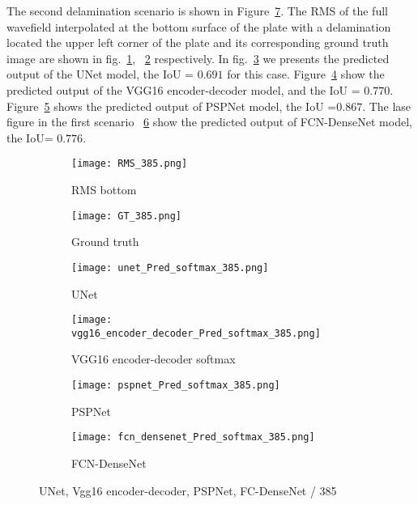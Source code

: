The second delamination scenario is shown in Figure~\ref{fig:385_softmax}. 
The RMS of the full wavefield interpolated at the bottom surface of the plate with a delamination located the upper left corner of the plate and its corresponding ground truth image are shown in fig.~\ref{fig:RMS_flat_shell_Vz_385}, ~\ref{fig:m1_rand_single_delam_385} respectively. 
In fig.~\ref{fig:Unet_Pred__softmax_385} we presents the predicted output of the UNet model, the IoU = \(0.691\) for this case.
Figure~\ref{fig:vgg16_pred__softmax_385} show the predicted output of the VGG16 encoder-decoder model, and the IoU = \(0.770\). 
Figure~\ref{fig:pspnet_pred__softmax_385} shows the predicted output of PSPNet model, the IoU =\(0.867\).
The lase figure in the first scenario ~\ref{fig:fcn_densenet_pred__softmax_385}	show the predicted output of FCN-DenseNet model, the IoU= \(0.776\).
\begin{figure}[!h]
	\centering
	\begin{subfigure}[b]{0.47\textwidth}
		\centering
		\texttt{[image: RMS\_385.png]}
		\caption{RMS bottom}
		\label{fig:RMS_flat_shell_Vz_385}
	\end{subfigure}
	\hfill
	\begin{subfigure}[b]{0.47\textwidth}
		\centering
		\texttt{[image: GT\_385.png]}
		\caption{Ground truth}
		\label{fig:m1_rand_single_delam_385}
	\end{subfigure}
	\begin{subfigure}[b]{0.47\textwidth}
		\centering
		\texttt{[image: unet\_Pred\_softmax\_385.png]}
		\caption{UNet}
		\label{fig:Unet_Pred__softmax_385}
	\end{subfigure}
	\hfill
	\begin{subfigure}[b]{0.47\textwidth}
		\centering
		\texttt{[image: vgg16\_encoder\_decoder\_Pred\_softmax\_385.png]}
		\caption{VGG16 encoder-decoder softmax}			\label{fig:vgg16_pred__softmax_385}			
	\end{subfigure}
	\hfill
	\begin{subfigure}[b]{0.47\textwidth}
		\centering
		\texttt{[image: pspnet\_Pred\_softmax\_385.png]}
		\caption{PSPNet}
		\label{fig:pspnet_pred__softmax_385}
	\end{subfigure}	
	\hfill
	\begin{subfigure}[b]{0.47\textwidth}
		\centering
		\texttt{[image: fcn\_densenet\_Pred\_softmax\_385.png]}
		\caption{FCN-DenseNet}
		\label{fig:fcn_densenet_pred__softmax_385}
	\end{subfigure}	
	\caption{UNet, Vgg16 encoder-decoder, PSPNet, FC-DenseNet / 385}
	\label{fig:385_softmax}
\end{figure}

